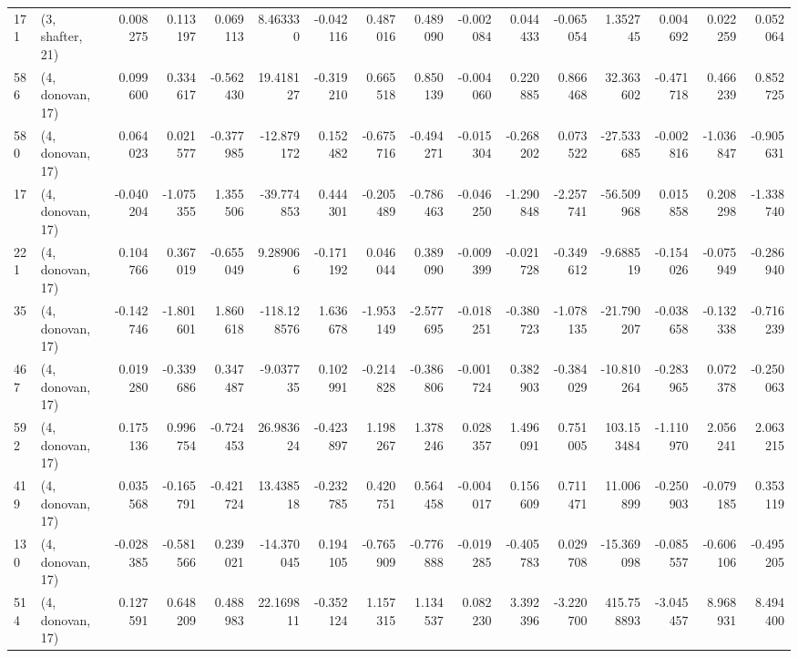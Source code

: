 \begin{tabular}{llrrrrrrrrrrrrrr}
171 &  (3, shafter, 21) &   0.008275 &  0.113197 &  0.069113 &    8.463330 & -0.042116 &   0.487016 &  0.489090 & -0.002084 &  0.044433 & -0.065054 &    1.352745 &  0.004692 &  0.022259 &  0.052064 \\
586 &  (4, donovan, 17) &   0.099600 &  0.334617 & -0.562430 &   19.418127 & -0.319210 &   0.665518 &  0.850139 & -0.004060 &  0.220885 &  0.866468 &   32.363602 & -0.471718 &  0.466239 &  0.852725 \\
580 &  (4, donovan, 17) &   0.064023 &  0.021577 & -0.377985 &  -12.879172 &  0.152482 &  -0.675716 & -0.494271 & -0.015304 & -0.268202 &  0.073522 &  -27.533685 & -0.002816 & -1.036847 & -0.905631 \\
17  &  (4, donovan, 17) &  -0.040204 & -1.075355 &  1.355506 &  -39.774853 &  0.444301 &  -0.205489 & -0.786463 & -0.046250 & -1.290848 & -2.257741 &  -56.509968 &  0.015858 &  0.208298 & -1.338740 \\
221 &  (4, donovan, 17) &   0.104766 &  0.367019 & -0.655049 &    9.289066 & -0.171192 &   0.046044 &  0.389090 & -0.009399 & -0.021728 & -0.349612 &   -9.688519 & -0.154026 & -0.075949 & -0.286940 \\
35  &  (4, donovan, 17) &  -0.142746 & -1.801601 &  1.860618 & -118.128576 &  1.636678 &  -1.953149 & -2.577695 & -0.018251 & -0.380723 & -1.078135 &  -21.790207 & -0.038658 & -0.132338 & -0.716239 \\
467 &  (4, donovan, 17) &   0.019280 & -0.339686 &  0.347487 &   -9.037735 &  0.102991 &  -0.214828 & -0.386806 & -0.001724 &  0.382903 & -0.384029 &  -10.810264 & -0.283965 &  0.072378 & -0.250063 \\
592 &  (4, donovan, 17) &   0.175136 &  0.996754 & -0.724453 &   26.983624 & -0.423897 &   1.198267 &  1.378246 &  0.028357 &  1.496091 &  0.751005 &  103.153484 & -1.110970 &  2.056241 &  2.063215 \\
419 &  (4, donovan, 17) &   0.035568 & -0.165791 & -0.421724 &   13.438518 & -0.232785 &   0.420751 &  0.564458 & -0.004017 &  0.156609 &  0.711471 &   11.006899 & -0.250903 & -0.079185 &  0.353119 \\
130 &  (4, donovan, 17) &  -0.028385 & -0.581566 &  0.239021 &  -14.370045 &  0.194105 &  -0.765909 & -0.776888 & -0.019285 & -0.405783 &  0.029708 &  -15.369098 & -0.085557 & -0.606106 & -0.495205 \\
514 &  (4, donovan, 17) &   0.127591 &  0.648209 &  0.488983 &   22.169811 & -0.352124 &   1.157315 &  1.134537 &  0.082230 &  3.392396 & -3.220700 &  415.758893 & -3.045457 &  8.968931 &  8.494400 \\

\end{tabular}
